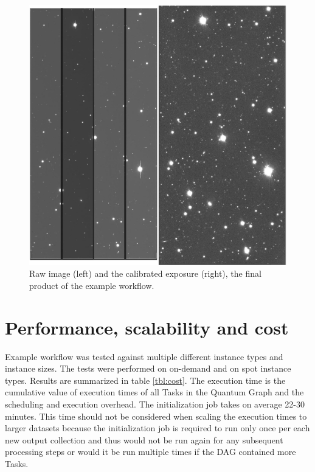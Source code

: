 \documentclass[a4paper, 10pt, conference]{ieeeconf}
\begin{document}
\begin{figure}[htb]
\centering
\includegraphics[width=\columnwidth]{figures/raw2calexp.png}
\caption{Raw image (left) and the calibrated exposure (right), the final product of the example workflow.}
\label{fig:demo-workflow}
\end{figure}


\section{Performance, scalability and cost}

Example workflow was tested against multiple different instance types and instance sizes. The tests were performed on on-demand and on spot instance types. Results are summarized in table \ref{tbl:cost}. The execution time is the cumulative value of execution times of all Tasks in the Quantum Graph and the scheduling and execution overhead. The initialization job takes on average 22-30 minutes. This time should not be considered when scaling the execution times to larger datasets because the initialization job is required to run only once per each new output collection and thus would not be run again for any subsequent processing steps or would it be run multiple times if the DAG contained more Tasks. 
\end{document}
